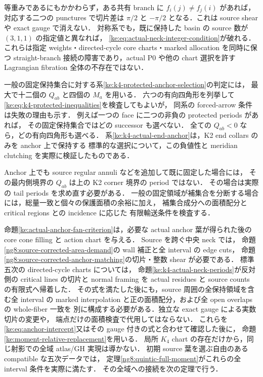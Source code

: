 \begin{remark}[既指定データに対する有限障害]
等重みであるにもかかわらず，ある共有 branch に
$f_i(j)\ne f_j(i)$ があれば，対応する二つの punctures で切片差は
$\pi/2$ と $-\pi/2$ となる．これは source shear や exact gauge で消えない．
対称系でも，既に保持した basin の source 数が $(3,1,1)$ の指定値と異なれば，
\eqref{ke:eq:actual-neck-integer-condition}が破れる．
これらは指定 weights・directed-cycle core charts・marked allocation を同時に保つ
straight-branch 接続の障害であり，actual P0 や他の chart 選択を許す
Lagrangian fibration 全体の不存在ではない．
\end{remark}

\begin{remark}[先指定保持領域に対する輸送条件]
一般の固定保持集合に対する系\ref{ke:k4-protected-anchor-selection}の判定には，
最大で十二個の $Q_{ab}$ と四個の $M_a$ を用いる．
六つの有向四角形を列挙して\eqref{ke:eq:k4-protected-inequalities}を検査してもよいが，
同系の forced-arrow 条件は失敗の理由も示す．
例えば一つの face に二つの非負の protected periods があれば，
その固定保持集合ではどの successor も選べない．
全ての $Q_{ab}<0$ なら，どの有向四角形も選べる．
系\ref{ke:k4-actual-end-anchor}は，K2 end collars のみを anchor 上で保持する
標準的な選択について，この負値性と meridian clutching を実際に検証したものである．

Anchor 上でも source regular annuli などを追加して既に固定した場合には，
その最内側境界の $Q_{ab}$ は上の K2 corner 境界の period ではない．
その場合は実際の tail periods を求め直す必要がある．
一般の固定領域が補集合を分断する場合には，総量一致と個々の保護面積の余裕に加え，
補集合成分への面積配分と critical regions との incidence に応じた
有限輸送条件を検査する．

命題\ref{ke:actual-anchor-fan-criterion}は，必要な actual anchor 葉が得られた後の
core cone filling と action chart を与える．
Source を跨ぐ中央 neck では，
命題\ref{ng8:source-corrected-area-demand}の wall 補正と全 interval の edge cuts，
命題\ref{ng8:source-corrected-anchor-matching}の切片・整数 shear が必要である．
標準五次の directed-cycle charts については，
命題\ref{ke:k4-actual-neck-periods}が反対側の critical lines の切片と
normal framing を actual residues と source counts の有限式へ帰着した．
その式を満たした後にも，source 周囲の全保持領域を含む全 interval の
marked interpolation と正の面積配分，および全 open overlaps の whole-fiber 一致を
別に構成する必要がある．独立な exact gauge による実数切片の変更や，
端点だけの面積検査で代用してはならない．
これらを\eqref{ke:eq:anchor-intercept}又はその gauge 付きの式と合わせて確認した後に，
命題\ref{ke:moment-relative-replacement}を用いる．
局所 $K_4$ chart の存在だけから，同じ射影での全域 atlas/GH 実現は導かない．
初期 source 葉を選ぶ自由のある compatible な五次データでは，
定理\ref{ng8:quintic-full-moment}がこれらの全 interval 条件を実際に満たす．
その全域への接続を次の定理で行う．
\end{remark}

